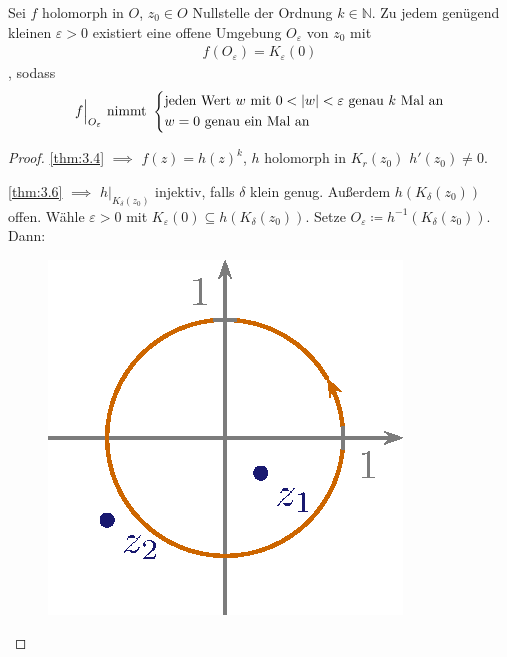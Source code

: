 \documentclass[a4paper,10pt]{scrbook}
\begin{document}
\begin{theorem} \label{thm:3.7}
  Sei $f$ holomorph in $O$, $z_0 \in O$ Nullstelle der Ordnung $k \in \mathbb{N}$. Zu jedem genügend kleinen $\varepsilon > 0$ existiert eine offene Umgebung $O_\varepsilon$ von $z_0$ mit
  \begin{align*}
    f(O_\varepsilon) = K_\varepsilon(0)
  \end{align*}
  , sodass
  \begin{align*}
    f\Big|_{O_\varepsilon} \text{ nimmt }
    \begin{dcases}
      \text{jeden Wert $w$ mit } 0 < |w| < \varepsilon \text{ genau $k$ Mal an} \\
      w=0 \text{ genau ein Mal an}
    \end{dcases}
  \end{align*}

  \begin{proof}
    \ref{thm:3.4} $\implies$ $f(z) = h(z)^k$, $h$ holomorph in $K_r(z_0)$ $h'(z_0) \neq 0$.

    \ref{thm:3.6} $\implies$ $h\Big|_{K_\delta(z_0)}$ injektiv, falls $\delta$ klein genug. Außerdem $h(K_\delta(z_0))$ offen. Wähle $\varepsilon > 0$ mit $K_\varepsilon(0) \subseteq h(K_\delta(z_0))$. Setze $O_\varepsilon \coloneq h^{-1}(K_\delta(z_0))$. Dann:

    \begin{figure}[H]
      \centering
      \includegraphics[scale=0.2]{images/ana3-tmp-26}
    \end{figure}
  \end{proof}
\end{theorem}
\end{document}
